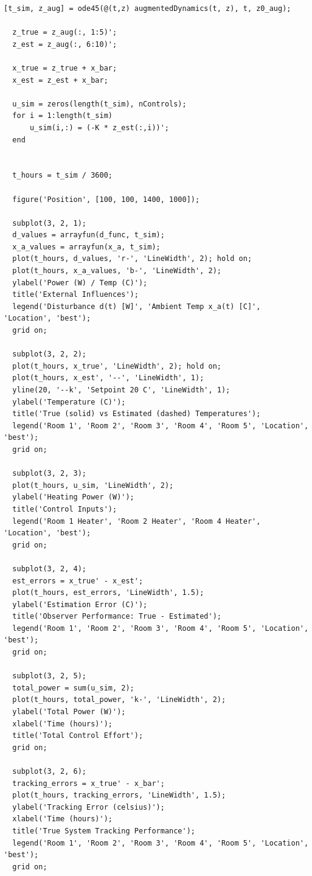 \documentclass[12pt,A4, onecolumn]{exam}
\begin{document}
\begin{questions}
\begin{lstlisting}[style=matlabstyle]
  [t_sim, z_aug] = ode45(@(t,z) augmentedDynamics(t, z), t, z0_aug);

  z_true = z_aug(:, 1:5)';
  z_est = z_aug(:, 6:10)';

  x_true = z_true + x_bar;
  x_est = z_est + x_bar;

  u_sim = zeros(length(t_sim), nControls);
  for i = 1:length(t_sim)
      u_sim(i,:) = (-K * z_est(:,i))';
  end


  t_hours = t_sim / 3600;

  figure('Position', [100, 100, 1400, 1000]);

  subplot(3, 2, 1);
  d_values = arrayfun(d_func, t_sim);
  x_a_values = arrayfun(x_a, t_sim);
  plot(t_hours, d_values, 'r-', 'LineWidth', 2); hold on;
  plot(t_hours, x_a_values, 'b-', 'LineWidth', 2);
  ylabel('Power (W) / Temp (C)');
  title('External Influences');
  legend('Disturbance d(t) [W]', 'Ambient Temp x_a(t) [C]', 'Location', 'best');
  grid on;

  subplot(3, 2, 2);
  plot(t_hours, x_true', 'LineWidth', 2); hold on;
  plot(t_hours, x_est', '--', 'LineWidth', 1);
  yline(20, '--k', 'Setpoint 20 C', 'LineWidth', 1);
  ylabel('Temperature (C)');
  title('True (solid) vs Estimated (dashed) Temperatures');
  legend('Room 1', 'Room 2', 'Room 3', 'Room 4', 'Room 5', 'Location', 'best');
  grid on;

  subplot(3, 2, 3);
  plot(t_hours, u_sim, 'LineWidth', 2);
  ylabel('Heating Power (W)');
  title('Control Inputs');
  legend('Room 1 Heater', 'Room 2 Heater', 'Room 4 Heater', 'Location', 'best');
  grid on;

  subplot(3, 2, 4);
  est_errors = x_true' - x_est';
  plot(t_hours, est_errors, 'LineWidth', 1.5);
  ylabel('Estimation Error (C)');
  title('Observer Performance: True - Estimated');
  legend('Room 1', 'Room 2', 'Room 3', 'Room 4', 'Room 5', 'Location', 'best');
  grid on;

  subplot(3, 2, 5);
  total_power = sum(u_sim, 2);
  plot(t_hours, total_power, 'k-', 'LineWidth', 2);
  ylabel('Total Power (W)');
  xlabel('Time (hours)');
  title('Total Control Effort');
  grid on;

  subplot(3, 2, 6);
  tracking_errors = x_true' - x_bar';
  plot(t_hours, tracking_errors, 'LineWidth', 1.5);
  ylabel('Tracking Error (celsius)');
  xlabel('Time (hours)');
  title('True System Tracking Performance');
  legend('Room 1', 'Room 2', 'Room 3', 'Room 4', 'Room 5', 'Location', 'best');
  grid on;

\end{lstlisting}


\end{questions}
\end{document}
